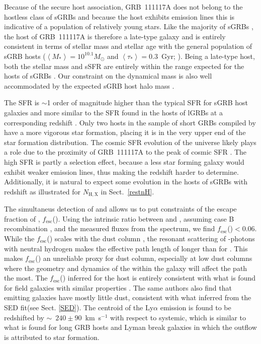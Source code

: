 \documentclass{aa}    %
\begin{document}
Because of the secure host association, GRB~111117A does not belong to the
hostless class of sGRBs \citep{Berger2010a} and because the host exhibits
emission lines this is indicative of a population of relatively young stars.
Like the majority of sGRBs \citep{Fong2013b}, the host of GRB~111117A is
therefore a late-type galaxy and is entirely consistent in terms of stellar mass
and stellar age with the general population of sGRB hosts ($\left\langle M _*
\right\rangle = 10^{10.1} M_{\odot}$ and $\left\langle \tau _* \right\rangle =
0.3 $~Gyr; \citealt{Leibler2010}). Being a late-type host, both the stellar mass
and sSFR are entirely within the range expected for the hosts of sGRBs
\citep{Behroozi2014}. Our constraint on the dynamical mass is also well
accommodated by the expected sGRB host halo mass \citep{Behroozi2014}.

The SFR is $\sim$1 order of magnitude higher than the typical SFR for sGRB host
galaxies \citep{Berger2014} and more similar to the SFR found in the hosts of
lGRBs at a corresponding redshift \citep{Kruhler2015}. Only two hosts in the
sample of short GRBs compiled by \citet{Berger2014} have a more vigorous star
formation, placing it is in the very upper end of the star formation
distribution. The cosmic SFR evolution of the universe likely plays a role due
to the proximity of GRB~111117A to the peak of cosmic SFR \citep{Madau2014}.
The high SFR is partly a selection effect, because a less star forming galaxy
would exhibit weaker emission lines, thus making the redshift harder to
determine. Additionally, it is natural to expect some evolution in the hosts of
sGRBs with redshift as illustrated for $N_\mathrm{H,X}$ in Sect.~\ref{restnH}.

The simultaneus detection of \lya{} and \ha{} allows us to put constraints of
the escape fraction of \lya{}, $f_{\mathrm{esc}}$(\lya). Using the intrinsic
ratio between \ha{} and \lya{}, assuming case B recombination
\citep{Brocklehurst1971}, and the measured fluxes from the spectrum, we find
$f_{\mathrm{esc}}$(\lya)$ < 0.06$. While the $f_{\mathrm{esc}}$(\lya) scales
with the dust column \citep{Hayes2011}, the resonant scattering of
\lya{}-photons with neutral hydrogen makes the effective path length of \lya{}
longer than for \ha{} \citep{Atek2009}. This makes $f_{\mathrm{esc}}$(\lya) an
unreliable proxy for dust column, especially at low dust columns
\citep{Atek2014} where the geometry and dynamics of the \hi{} within the galaxy
will affect the \lya{} path the most. The $f_{\mathrm{esc}}$(\lya) inferred for
the host is entirely consistent with what is found for field galaxies with
similar properties \citep{Oyarzun2017}. The same authors also find that \lya{}
emitting galaxies have mostly little dust, consistent with what inferred from
the SED fit(see Sect. \ref{SED}). The centroid of the Ly$\alpha$ emission is
found to be redshifted by $\sim$~$240\pm 90$~km~s$^{-1}$ with respect to
systemic, which is similar to what is found for long GRB hosts
\citep{Milvang-Jensen2012a} and Lyman break galaxies \citep{Shapley2003a} in
which the outflow is attributed to star formation.
\end{document}
